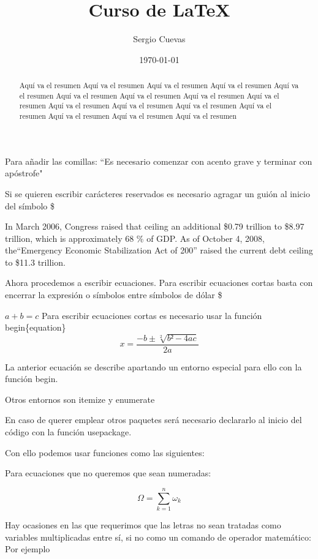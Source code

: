 \documentclass[12pt, landscape,letterpaper]{article}
\title{Curso de \LaTeX}
\author{Sergio Cuevas}
\date{\today}
\begin{document}
	
	\maketitle
	\begin{abstract}
	Aquí va el resumen Aquí va el resumen Aquí va el resumen Aquí va el resumen Aquí va el resumen Aquí va el resumen Aquí va el resumen Aquí va el resumen Aquí va el resumen Aquí va el resumen Aquí va el resumen Aquí va el resumen Aquí va el resumen Aquí va el resumen Aquí va el resumen Aquí va el resumen 
	\end{abstract}

	Para añadir las comillas: ``Es necesario comenzar con acento grave y terminar con apóstrofe"
	
	Si se quieren escribir carácteres reservados es necesario agragar un guión al inicio del símbolo
	\$
	
	In March 2006, Congress raised that ceiling an additional \$0.79 trillion to \$8.97 trillion, which is 	    approximately 68 \% of GDP. As of October 4, 2008, the``Emergency Economic Stabilization Act of 200'' raised the current debt ceiling to \$11.3 trillion.
	
	Ahora procedemos a escribir ecuaciones.
	Para escribir ecuaciones cortas basta con encerrar la expresión o símbolos entre símbolos de dólar \$
	
$a+b=c$
Para escribir ecuaciones cortas es necesario usar la función begin\{equation\}
\begin{equation}
x=\frac{-b \pm \sqrt[2]{b²-4ac}}{2a}
\end{equation}

La anterior ecuación se describe apartando un entorno especial para ello con la función begin. 

Otros entornos son itemize y enumerate

En caso de querer emplear otros paquetes será necesario declararlo al inicio del código con la función usepackage.

Con ello podemos usar funciones como las siguientes:

Para ecuaciones que no queremos que sean numeradas:

\begin{equation*}
	\Omega=\sum_{k=1}^{n} \omega_k
\end{equation*}

Hay ocasiones en las que requerimos que las letras no sean tratadas como variables multiplicadas entre sí, si no como un comando de operador matemático:
Por ejemplo
\end{document}
